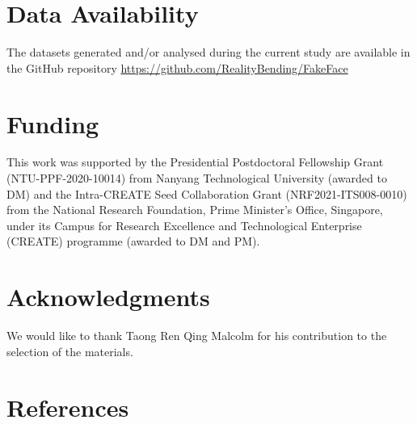 \documentclass[
  man,floatsintext]{apa6}
\begin{document}
\hypertarget{data-availability}{%
\section{Data Availability}\label{data-availability}}

The datasets generated and/or analysed during the current study are available in the GitHub repository \url{https://github.com/RealityBending/FakeFace}

\hypertarget{funding}{%
\section{Funding}\label{funding}}

This work was supported by the Presidential Postdoctoral Fellowship Grant (NTU-PPF-2020-10014) from Nanyang Technological University (awarded to DM) and the Intra-CREATE Seed Collaboration Grant (NRF2021-ITS008-0010) from the National Research Foundation, Prime Minister's Office, Singapore, under its Campus for Research Excellence and Technological Enterprise (CREATE) programme (awarded to DM and PM).

\hypertarget{acknowledgments}{%
\section{Acknowledgments}\label{acknowledgments}}

We would like to thank Taong Ren Qing Malcolm for his contribution to the selection of the materials.

\newpage

\hypertarget{references}{%
\section{References}\label{references}}
\end{document}
